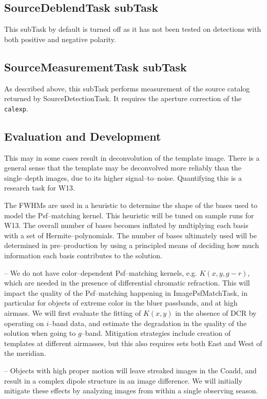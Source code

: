 \documentclass[12pt]{article}
\begin{document}
\subsection{SourceDeblendTask subTask}
This subTask by default is turned off as it has not been tested on detections
with both positive and negative polarity.

\subsection{SourceMeasurementTask subTask}
As described above, this subTask performs measurement of the source
catalog returned by SourceDetectionTask.  It requires the aperture
correction of the {\tt calexp}.

\subsection{Evaluation and Development}

This may in some cases result in
deconvolution of the template image.  There is a general sense that
the template may be deconvolved more reliably than the single--depth
images, due to its higher signal--to--noise.  Quantifying this is a
research task for W13.

The FWHMs are used in a heuristic to determine the shape of
the bases used to model the Psf--matching kernel.  This heuristic will
be tuned on sample runs for W13.  The overall number of bases becomes
inflated by multiplying each basis with a set of Hermite--polynomials.
The number of bases ultimately used will be determined in
pre--production by using a principled means of deciding how much
information each basis contributes to the solution.  

-- We do not have color--dependent Psf--matching kernels,
e.g. $K(x,y,g-r)$, which are needed in the presence of differential
chromatic refraction.  This will impact the quality of the
Psf--matching happening in ImagePsfMatchTask, in particular for
objects of extreme color in the bluer passbands, and at high airmass.
We will first evaluate the fitting of $K(x,y)$ in the absence of
DCR by operating on $i$--band data, and estimate the degradation in
the quality of the solution when going to $g$--band.  Mitigation
strategies include creation of templates at different airmasses, but
this also requires sets both East and West of the meridian.

-- Objects with high proper motion will leave streaked images in the
Coadd, and result in a complex dipole structure in an image
difference.  We will initially mitigate these effects by analyzing
images from within a single observing season.
\end{document}
